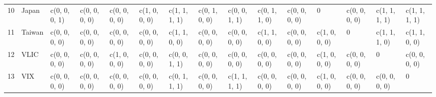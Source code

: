 \begin{table}[ht]
\begin{tabular}{lllllllllllllll}
  10 & Japan & c(0, 0, 0, 1) & c(0, 0, 0, 0) & c(0, 0, 0, 0) & c(1, 0, 0, 0) & c(1, 1, 1, 1) & c(0, 1, 0, 0) & c(0, 0, 1, 1) & c(0, 1, 1, 0) & c(0, 0, 0, 0) &             0 & c(0, 0, 0, 0) & c(1, 1, 1, 1) & c(1, 1, 1, 1) \\ 
  11 & Taiwan & c(0, 0, 0, 0) & c(0, 0, 0, 0) & c(0, 0, 0, 0) & c(0, 0, 0, 0) & c(1, 1, 0, 0) & c(0, 0, 0, 0) & c(0, 0, 0, 0) & c(1, 1, 0, 0) & c(0, 0, 0, 0) & c(1, 0, 0, 0) &             0 & c(1, 1, 1, 0) & c(1, 1, 0, 0) \\ 
  12 & VLIC & c(0, 0, 0, 0) & c(0, 0, 0, 0) & c(1, 0, 0, 0) & c(0, 0, 0, 0) & c(0, 0, 1, 1) & c(0, 0, 0, 0) & c(0, 0, 0, 0) & c(0, 0, 0, 0) & c(0, 0, 0, 0) & c(1, 0, 0, 0) & c(0, 0, 0, 0) &             0 & c(0, 0, 0, 0) \\ 
  13 & VIX & c(0, 0, 0, 0) & c(0, 0, 0, 0) & c(0, 0, 0, 0) & c(0, 0, 0, 0) & c(0, 1, 1, 1) & c(0, 0, 0, 0) & c(1, 1, 1, 1) & c(0, 0, 0, 0) & c(0, 0, 0, 0) & c(1, 0, 0, 0) & c(0, 0, 0, 0) & c(0, 0, 0, 0) &             0 \\ 
   \hline
\end{tabular}
\end{table}
